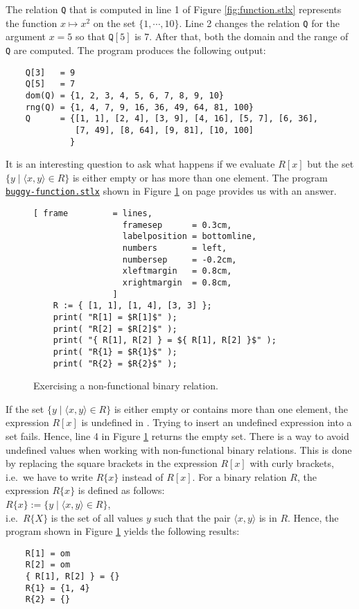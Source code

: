 The relation \texttt{Q} that is computed in line 1 of Figure \ref{fig:function.stlx} represents the
function $x \mapsto x^2$ on the set $\{ 1, \cdots, 10 \}$.  
Line 2 changes the relation \texttt{Q} for the argument $x=5$ so that  $\mathtt{Q}[5]$ is
$7$.   After that, both the domain and the range of \texttt{Q} are computed.
The program produces the following output:
\begin{verbatim}
    Q[3]   = 9
    Q[5]   = 7
    dom(Q) = {1, 2, 3, 4, 5, 6, 7, 8, 9, 10}
    rng(Q) = {1, 4, 7, 9, 16, 36, 49, 64, 81, 100}
    Q      = {[1, 1], [2, 4], [3, 9], [4, 16], [5, 7], [6, 36], 
              [7, 49], [8, 64], [9, 81], [10, 100]
             }
\end{verbatim}
It is an  interesting question to ask what happens if we evaluate $R[x]$ but the set 
 $\{ y \mid \langle x, y \rangle \in R \}$ is either empty or has more than one element.
The program 
\href{https://github.com/karlstroetmann/Logik/blob/master/SetlX/buggy-function.stlx}{\texttt{buggy-function.stlx}}
shown in Figure
\ref{fig:buggy-function.stlx} on page \pageref{fig:buggy-function.stlx} provides us with an answer.


\begin{figure}[!ht]
  \centering
\begin{Verbatim}[ frame         = lines, 
                  framesep      = 0.3cm, 
                  labelposition = bottomline,
                  numbers       = left,
                  numbersep     = -0.2cm,
                  xleftmargin   = 0.8cm,
                  xrightmargin  = 0.8cm,
                ]
    R := { [1, 1], [1, 4], [3, 3] };
    print( "R[1] = $R[1]$" );
    print( "R[2] = $R[2]$" );
    print( "{ R[1], R[2] } = ${ R[1], R[2] }$" );
    print( "R{1} = $R{1}$" );
    print( "R{2} = $R{2}$" );
\end{Verbatim} 
\vspace*{-0.3cm}
\caption{Exercising a non-functional binary relation.}  \label{fig:buggy-function.stlx}
\end{figure} 

If the set  $\{ y \mid \langle x, y \rangle \in R \}$ is either empty or contains more than one
element, the expression $R[x]$ is undefined in \setlx.  Trying to insert an undefined expression
into a set fails.  Hence, line 4 in Figure \ref{fig:buggy-function.stlx} returns the empty set.
There is a way to avoid undefined values when working with non-functional binary relations.
This is done by replacing the square brackets in the expression $R[x]$ with curly brackets, i.e.~we
have to write $R\{x\}$ instead of $R[x]$.
For a binary relation $R$, the expression  $R\{x\}$  is defined as follows:
\\[0.2cm]
\hspace*{1.3cm}
 $R\{x\} := \{ y \mid \langle x, y \rangle \in R \}$,
\\[0.2cm]
i.e.~$R\{X\}$ is the set of all values $y$ such that the pair $\langle x, y \rangle$ is in $R$.
Hence, the program shown in Figure  \ref{fig:buggy-function.stlx} yields the following results:
\begin{verbatim}
    R[1] = om
    R[2] = om
    { R[1], R[2] } = {}
    R{1} = {1, 4}
    R{2} = {}
\end{verbatim}

